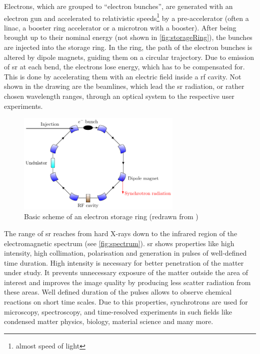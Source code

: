 Electrons, which are grouped to ``electron bunches'', are generated with an electron gun and accelerated to relativistic speeds\footnote{almost speed of light} by a pre-accelerator (often a \gls{linac}, a booster ring accelerator or a microtron with a booster). 
After being brought up to their nominal energy (not shown in \autoref{fig:storageRing}), the bunches are injected into the storage ring.
In the ring, the path of the electron bunches is altered by dipole magnets, guiding them on a circular trajectory.
Due to emission of \gls{sr} at each bend, the electrons lose energy, which has to be compensated for.
This is done by accelerating them with an electric field inside a \gls{rf} cavity.
Not shown in the drawing are the beamlines, which lead the \gls{sr} radiation, or rather chosen wavelength ranges, through an optical system to the respective user experiments. \cite{roussel2014,rota2018}

\begin{figure}[H]
	\centering
	\includegraphics[width=0.7\textwidth]{chap/02-theory/img/bd/synchrotron.pdf}
	\caption{Basic scheme of an electron storage ring (redrawn from \cite{roussel2014})}
	\label{fig:storageRing}
\end{figure}

The range of \gls{sr} reaches from hard X-rays down to the infrared region of the electromagnetic spectrum (see \autoref{fig:spectrum}). \Gls{sr} shows properties like high intensity, high collimation, polarisation and generation in pulses of well-defined time duration.
High intensity is necessary for better penetration of the matter under study.
It prevents unnecessary exposure of the matter outside the area of interest and improves the image quality by producing less scatter radiation from these areas.
Well defined duration of the pulses allows to observe chemical reactions on short time scales.
Due to this properties, synchrotrons are used for microscopy, spectroscopy, and time-resolved experiments in such fields like condensed matter physics, biology, material science and many more.

